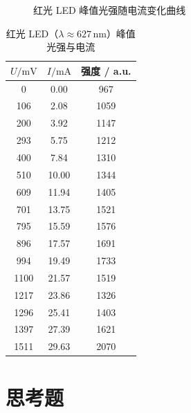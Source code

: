 \documentclass[a4paper,8pt,twocolumn]{article}
\begin{document}
\begin{figure}[htbp]
  \centering
  \caption{红光 LED 峰值光强随电流变化曲线}
\end{figure}
\begin{table}[H]
\centering
\caption{红光 LED（$\lambda \approx 627\,\mathrm{nm}$）峰值光强与电流}
\begin{tabular}{ccc}
\toprule
$U/\mathrm{mV}$ & $I/\mathrm{mA}$ & 强度 / a.u. \\
\midrule
0    & 0.00 & 967  \\
106  & 2.08 & 1059 \\
200  & 3.92 & 1147 \\
293  & 5.75 & 1212 \\
400  & 7.84 & 1310 \\
510  & 10.00 & 1344 \\
609  & 11.94 & 1405 \\
701  & 13.75 & 1521 \\
795  & 15.59 & 1576 \\
896  & 17.57 & 1691 \\
994  & 19.49 & 1733 \\
1100 & 21.57 & 1519 \\
1217 & 23.86 & 1326 \\
1296 & 25.41 & 1403 \\
1397 & 27.39 & 1621 \\
1511 & 29.63 & 2070 \\
\bottomrule
\end{tabular}
\end{table}


\section{思考题}
\end{document}
